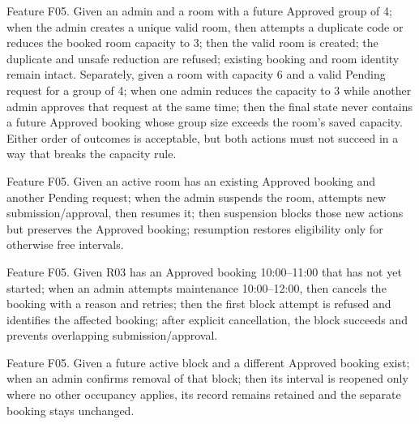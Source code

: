 \begin{description}[style=nextline,leftmargin=0pt,labelindent=0pt,labelsep=0pt,font=\bfseries,itemsep=4pt]
\item[AC-15 Room creation and safe editing] Feature F05. Given an admin and a room with a future Approved group of 4; when the admin creates a unique valid room, then attempts a duplicate code or reduces the booked room capacity to 3; then the valid room is created; the duplicate and unsafe reduction are refused; existing booking and room identity remain intact. Separately, given a room with capacity 6 and a valid Pending request for a group of 4; when one admin reduces the capacity to 3 while another admin approves that request at the same time; then the final state never contains a future Approved booking whose group size exceeds the room's saved capacity. Either order of outcomes is acceptable, but both actions must not succeed in a way that breaks the capacity rule.
\item[AC-16 Suspend and resume] Feature F05. Given an active room has an existing Approved booking and another Pending request; when the admin suspends the room, attempts new submission/approval, then resumes it; then suspension blocks those new actions but preserves the Approved booking; resumption restores eligibility only for otherwise free intervals.
\item[AC-17 Resolve booking before maintenance] Feature F05. Given R03 has an Approved booking 10:00--11:00 that has not yet started; when an admin attempts maintenance 10:00--12:00, then cancels the booking with a reason and retries; then the first block attempt is refused and identifies the affected booking; after explicit cancellation, the block succeeds and prevents overlapping submission/approval.
\item[AC-18 Remove future maintenance] Feature F05. Given a future active block and a different Approved booking exist; when an admin confirms removal of that block; then its interval is reopened only where no other occupancy applies, its record remains retained and the separate booking stays unchanged.
\end{description}

\clearpage